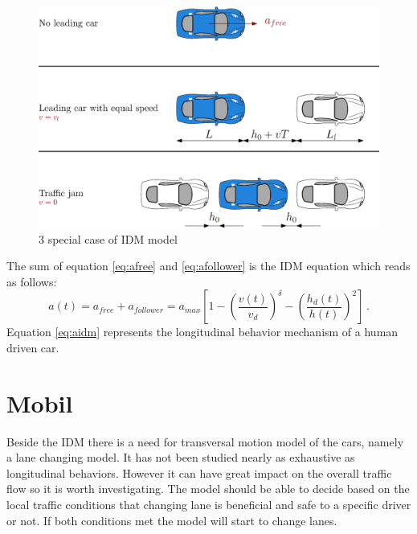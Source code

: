 \documentclass[a4paper,11pt,twoside]{report}
\begin{document}
			\begin{figure}[ht]
				\centering
				\includegraphics[width=\textwidth]{idm.eps}
				\caption{3 special case of IDM model}
				\label{fig:idm}
			\end{figure}
			The sum of equation \ref{eq:afree} and \ref{eq:afollower} is the IDM equation which reads as follows:
			\begin{equation}
				a(t)=a_{free}+a_{follower}=a_{max}\left [ 1 - \left ( \frac{v(t)}{v_d} \right )^\delta - \left ( \frac{h_d(t)}{h(t)} \right )^2 \right ]\,.
				\label{eq:aidm}
			\end{equation}
			Equation \ref{eq:aidm} represents the longitudinal behavior mechanism of a human driven car.
		\section{Mobil} \label{sec:MOBIL}
			Beside the IDM there is a need for transversal motion model of the cars, namely a lane changing model. It has not been studied nearly as exhaustive as longitudinal behaviors. However it can have great impact on the overall traffic flow so it is worth investigating. The model should be able to decide based on the local traffic conditions that changing lane is beneficial and safe to a specific driver or not. If both conditions met the model will start to change lanes.
\end{document}
